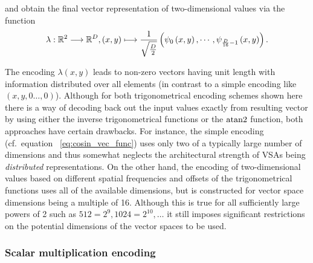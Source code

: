 and obtain the final vector representation of two-dimensional values via the function 
\begin{equation}
\label{eq:cosin_2d_enc}
\lambda: \mathbb{R}^2 \longrightarrow \mathbb{R}^D, \left(x,y\right) \longmapsto \frac{1}{\sqrt{\frac{D}{2}}}\left(\psi_0\left(x,y\right), \cdots, \psi_{\frac{D}{16}-1}\left(x,y\right)\right).
\end{equation}

The encoding $\lambda\left(x, y\right)$ leads to non-zero vectors having unit length with information distributed over all elements (in contrast to a simple encoding like $\left(x, y, 0 \ldots, 0\right)$).
Although for both trigonometrical encoding schemes shown here there is a way of decoding back out the input values exactly from resulting vector by using either the inverse trigonometrical functions or the $\operatorname{atan2}$ function, both approaches have certain drawbacks.
For instance, the simple encoding (cf.\ equation ~\ref{eq:cosin_vec_func}) uses only two of a typically large number of dimensions and thus somewhat neglects the architectural strength of \acp{VSA} being \emph{distributed} representations.
On the other hand, the encoding of two-dimensional values based on different spatial frequencies and offsets of the trigonometrical functions uses all of the available dimensions, but is constructed for vector space dimensions being a multiple of \num{16}.
Although this is true for all sufficiently large powers of \num{2} such as $512=2^{9}, 1024=2^{10}, \ldots$ it still imposes significant restrictions on the potential dimensions of the vector spaces to be used.

\subsubsection{Scalar multiplication encoding}%
\label{ssubsec:scalar_multiplication_encoding}

